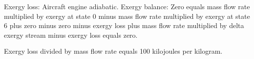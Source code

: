 Exergy loss: Aircraft engine adiabatic.  
Exergy balance:  
Zero equals mass flow rate multiplied by exergy at state 0 minus mass flow rate multiplied by exergy at state 6 plus zero minus zero minus exergy loss plus mass flow rate multiplied by delta exergy stream minus exergy loss equals zero.  

Exergy loss divided by mass flow rate equals 100 kilojoules per kilogram.
